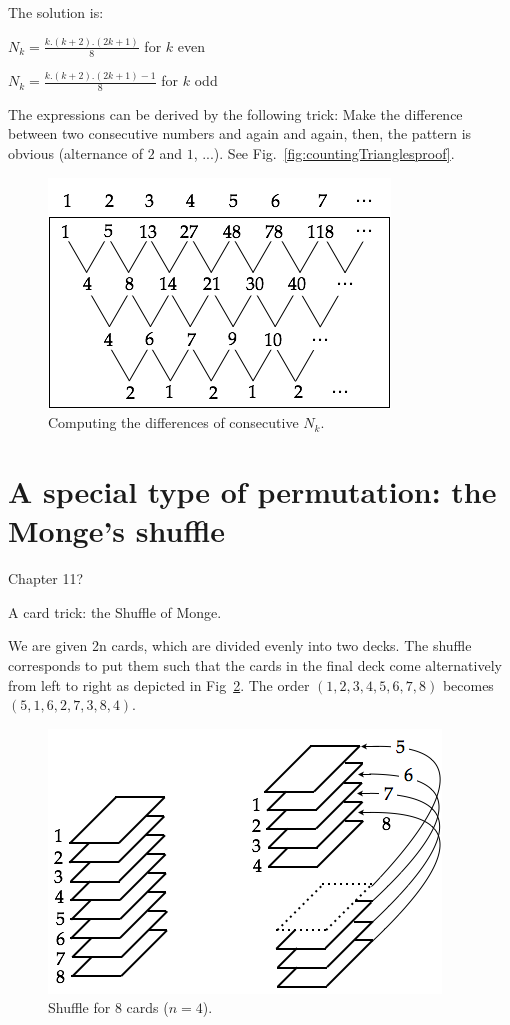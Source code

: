 \documentclass{article}[12pt]
\begin{document}
The solution is:

$N_k = \frac{k.(k+2).(2k+1)}{8}$ for $k$ even

$N_k = \frac{k.(k+2).(2k+1)-1}{8}$ for $k$ odd
\bigskip

The expressions can be derived by the following trick:
Make the difference between two consecutive numbers and again and again, then, the pattern is obvious
(alternance of $2$ and $1$, ...). See Fig.~\ref{fig:countingTrianglesproof}.
\begin{figure}[h]
\begin{center}
        \includegraphics[scale=0.5]{FiguresArithmetic/CountingTrianglesProof} 
        \caption{Computing the differences of consecutive $N_k$.}
        \label{fig:countingTrianglesProof}
\end{center}
\end{figure}


\section{A special type of permutation: the Monge's shuffle}

Chapter 11?

A card trick: the Shuffle of Monge.

We are given 2n cards, which are divided evenly into two decks. 
The shuffle corresponds to put them such that the cards in the final deck come alternatively from left to right as depicted 
in Fig~\ref{fig:suffleMonge}.
The order $(1,2,3,4,5,6,7,8)$ becomes $(5,1,6,2,7,3,8,4)$.
\begin{figure}[h]
\begin{center}
        \includegraphics[scale=0.5]{FiguresArithmetic/suffleMonge} 
        \caption{Shuffle for $8$ cards ($n=4$).}
        \label{fig:suffleMonge}
\end{center}
\end{figure}
\end{document}
